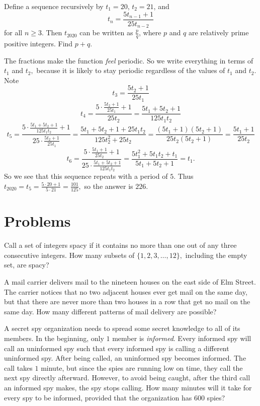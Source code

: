 \documentclass[blue,onecol]{shooting}
\begin{document}
\begin{exam}[AIME II 2020/6]
Define a sequence recursively by $t_1 = 20$, $t_2 = 21$, and$$t_n = \frac{5t_{n-1}+1}{25t_{n-2}}$$for all $n \ge 3$. Then $t_{2020}$ can be written as $\frac{p}{q}$, where $p$ and $q$ are relatively prime positive integers. Find $p+q$.
\end{exam}
\begin{sol}
The fractions make the function \textit{feel} periodic. So we write everything in terms of $t_1$ and $t_2,$ because it is likely to stay periodic regardless of the values of $t_1$ and $t_2.$ Note
\[t_3=\frac{5t_2+1}{25t_1}\]
\[t_4=\frac{5\cdot \frac{5t_2+1}{25t_1}+1}{25t_2}=\frac{5t_1+5t_2+1}{125t_1t_2}\]
\[t_5=\frac{5\cdot \frac{5t_1+5t_2+1}{125t_1t_2}+1}{25\cdot \frac{5t_2+1}{25t_1}}=\frac{5t_1+5t_2+1+25t_1t_2}{125t_2^2+25t_2}=\frac{(5t_1+1)(5t_2+1)}{25t_2(5t_2+1)}=\frac{5t_1+1}{25t_2}\]
\[t_6=\frac{5\cdot \frac{5t_1+1}{25t_2}+1}{25\cdot \frac{5t_1+5t_2+1}{125t_1t_2}}=\frac{5t_1^2+5t_1t_2+t_1}{5t_1+5t_2+1}=t_1.\]
So we see that this sequence repeats with a period of $5.$ Thus $t_{2020}=t_5=\frac{5\cdot 20+1}{5\cdot 21}=\frac{101}{125},$ so the answer is $226.$
\end{sol}

\pagebreak

\section{Problems}
    
\begin{prob}[AMC 12A 2007/25]{2}
Call a set of integers spacy if it contains no more than one out of any three consecutive integers. How many subsets of $\{1,2,3,\ldots,12\},$ including the empty set, are spacy?
\end{prob}

\begin{prob}[AIME I 2001/14]{2}
A mail carrier delivers mail to the nineteen houses on the east side of Elm Street. The carrier notices that no two adjacent houses ever get mail on the same day, but that there are never more than two houses in a row that get no mail on the same day. How many different patterns of mail delivery are possible?
\end{prob}

\begin{prob}{3}
A secret spy organization needs to spread some secret knowledge to all of its members. In the beginning, only $1$ member is \textit{informed}. Every informed spy will call an uninformed spy such that every informed spy is calling a different uninformed spy. After being called, an uninformed spy becomes informed. The call takes $1$ minute, but since the spies are running low on time, they call the next spy directly afterward. However, to avoid being caught, after the third call an informed spy makes, the spy stops calling. How many minutes will it take for every spy to be informed, provided that the organization has $600$ spies?
\end{prob}
\end{document}
